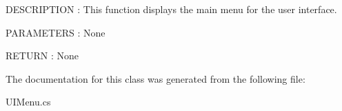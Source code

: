 D\+E\+S\+C\+R\+I\+P\+T\+I\+O\+N \+: This function displays the main menu for the user interface.

P\+A\+R\+A\+M\+E\+T\+E\+R\+S \+: None

R\+E\+T\+U\+R\+N \+: None 

The documentation for this class was generated from the following file\+:\begin{DoxyCompactItemize}
\item 
U\+I\+Menu.\+cs\end{DoxyCompactItemize}
